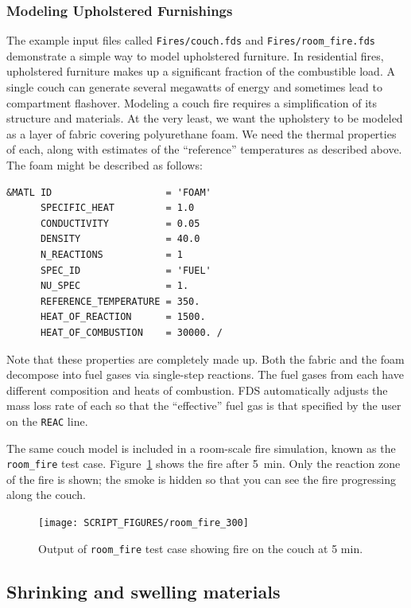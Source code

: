 \documentclass[11pt]{book}
\newcommand{\ct}{\tt\small}
\begin{document}
\subsubsection{Modeling Upholstered Furnishings}

The example input files called {\ct Fires/couch.fds} and {\ct Fires/room\_fire.fds} demonstrate a simple way to model upholstered furniture.
In residential fires, upholstered furniture makes up a significant
fraction of the combustible load. A single couch can generate several
megawatts of energy and sometimes lead to compartment flashover. Modeling
a couch fire requires a simplification of its structure and materials.
At the very least, we want the upholstery to be modeled as a layer of fabric covering polyurethane foam. We need the thermal properties of each, along with estimates of the ``reference'' temperatures as described above. The foam might be described as follows:

\footnotesize
\begin{verbatim}
&MATL ID                    = 'FOAM'
      SPECIFIC_HEAT         = 1.0
      CONDUCTIVITY          = 0.05
      DENSITY               = 40.0
      N_REACTIONS           = 1
      SPEC_ID               = 'FUEL'
      NU_SPEC               = 1.
      REFERENCE_TEMPERATURE = 350.
      HEAT_OF_REACTION      = 1500.
      HEAT_OF_COMBUSTION    = 30000. /
\end{verbatim} \normalsize

\noindent
Note that these properties are completely made up.
Both the fabric and the foam decompose into fuel gases via
single-step reactions. The fuel gases from each have different
composition and heats of combustion. FDS automatically adjusts
the mass loss rate of each so that the ``effective'' fuel gas
is that specified by the user on the {\ct REAC} line.

The same couch model is included in a room-scale fire simulation, known as the
{\ct room\_fire} test case. Figure~\ref{room_fire} shows the fire after 5~min.
Only the reaction zone of the fire is shown; the smoke is hidden so that you can see the fire progressing
along the couch. 

\begin{figure}[p]
\texttt{[image: SCRIPT\_FIGURES/room\_fire\_300]}
\caption[Results of the {\ct room\_fire} test case]{Output of {\ct room\_fire} test case showing fire on the couch at
5 min.}
\label{room_fire}
\end{figure}

\subsection{Shrinking and swelling materials}
\label{info:shrink_swell}
\end{document}
